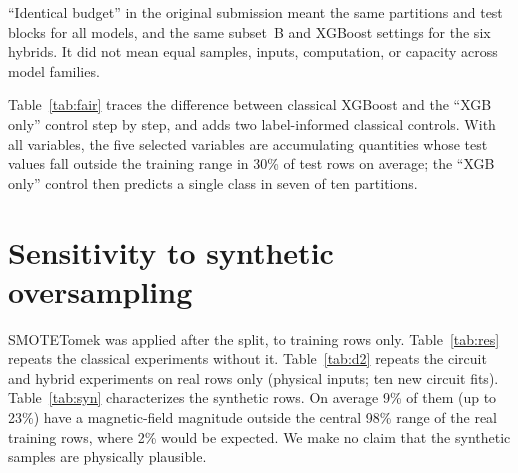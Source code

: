 \documentclass[10pt,a4paper]{article}
\newcommand{\T}[1]{}
\begin{document}
``Identical budget'' in the original submission meant the same partitions
and test blocks for all models, and the same subset~B and XGBoost settings
for the six hybrids. It did not mean equal samples, inputs, computation, or
capacity across model families.

Table~\ref{tab:fair} traces the difference between classical XGBoost and
the ``XGB only'' control step by step, and adds two label-informed
classical controls. With all variables, the five selected variables are
accumulating quantities whose test values fall outside the training range
in 30\% of test rows on average; the ``XGB only'' control then predicts a
single class in seven of ten partitions.

\begin{table}[h]\centering\small
\caption{Mean F1 (standard deviation) for the fairness decomposition and added controls.}\label{tab:fair}
\T{S5_fairness}
\end{table}

\section{Sensitivity to synthetic oversampling}
SMOTETomek was applied after the split, to training rows only.
Table~\ref{tab:res} repeats the classical experiments without it.
Table~\ref{tab:d2} repeats the circuit and hybrid experiments on real rows
only (physical inputs; ten new circuit fits). Table~\ref{tab:syn}
characterizes the synthetic rows. On average 9\% of them (up to 23\%) have
a magnetic-field magnitude outside the central 98\% range of the real
training rows, where 2\% would be expected. We make no claim that the
synthetic samples are physically plausible.

\begin{table}[h]\centering\footnotesize
\caption{Classical models with and without SMOTETomek (means over ten partitions).}\label{tab:res}
\T{S6_resampling}
\end{table}
\begin{table}[h]\centering\footnotesize
\caption{Circuit and hybrids without synthetic rows (physical inputs).}\label{tab:d2}
\resizebox{\linewidth}{!}{\T{S6_dru_no_resampling}}
\end{table}
\begin{table}[h]\centering\footnotesize
\caption{Synthetic rows in the rebalanced training sets (physical inputs).}\label{tab:syn}
\resizebox{\linewidth}{!}{\T{S6_synthetic}}
\end{table}
\end{document}
